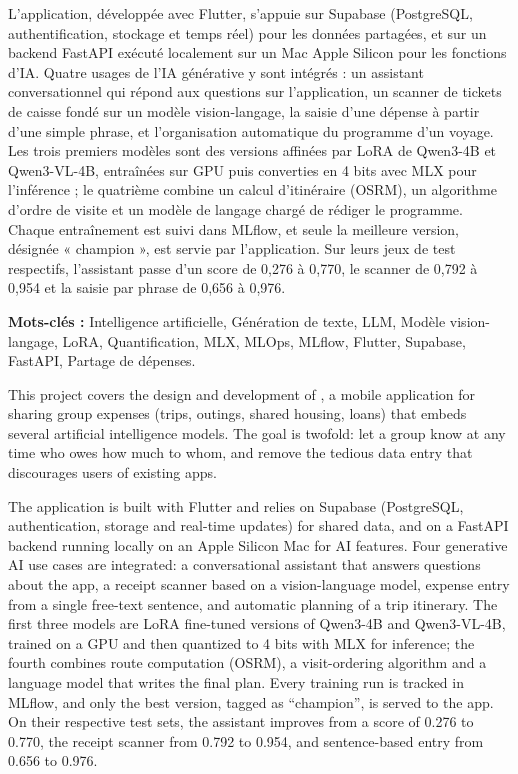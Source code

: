 L'application, développée avec Flutter, s'appuie sur Supabase (PostgreSQL, authentification,
stockage et temps réel) pour les données partagées, et sur un backend FastAPI exécuté
localement sur un Mac Apple Silicon pour les fonctions d'IA. Quatre usages de l'IA
générative y sont intégrés : un assistant conversationnel qui répond aux questions sur
l'application, un scanner de tickets de caisse fondé sur un modèle vision-langage, la
saisie d'une dépense à partir d'une simple phrase, et l'organisation automatique du
programme d'un voyage. Les trois premiers modèles sont des versions affinées par LoRA de
Qwen3-4B et Qwen3-VL-4B, entraînées sur GPU puis converties en 4 bits avec MLX pour
l'inférence ; le quatrième combine un calcul d'itinéraire (OSRM), un algorithme d'ordre de
visite et un modèle de langage chargé de rédiger le programme. Chaque entraînement est
suivi dans MLflow, et seule la meilleure version, désignée « champion », est servie par
l'application. Sur leurs jeux de test respectifs, l'assistant passe d'un score de 0,276 à
0,770, le scanner de 0,792 à 0,954 et la saisie par phrase de 0,656 à 0,976.

\noindent\textbf{Mots-clés :} Intelligence artificielle, Génération de texte, LLM,
Modèle vision-langage, LoRA, Quantification, MLX, MLOps, MLflow, Flutter, Supabase,
FastAPI, Partage de dépenses.


This project covers the design and development of \equipay, a mobile application for
sharing group expenses (trips, outings, shared housing, loans) that embeds several
artificial intelligence models. The goal is twofold: let a group know at any time who
owes how much to whom, and remove the tedious data entry that discourages users of
existing apps.

The application is built with Flutter and relies on Supabase (PostgreSQL, authentication,
storage and real-time updates) for shared data, and on a FastAPI backend running locally
on an Apple Silicon Mac for AI features. Four generative AI use cases are integrated: a
conversational assistant that answers questions about the app, a receipt scanner based on
a vision-language model, expense entry from a single free-text sentence, and automatic
planning of a trip itinerary. The first three models are LoRA fine-tuned versions of
Qwen3-4B and Qwen3-VL-4B, trained on a GPU and then quantized to 4 bits with MLX for
inference; the fourth combines route computation (OSRM), a visit-ordering algorithm and a
language model that writes the final plan. Every training run is tracked in MLflow, and
only the best version, tagged as ``champion'', is served to the app. On their respective
test sets, the assistant improves from a score of 0.276 to 0.770, the receipt scanner from
0.792 to 0.954, and sentence-based entry from 0.656 to 0.976.

